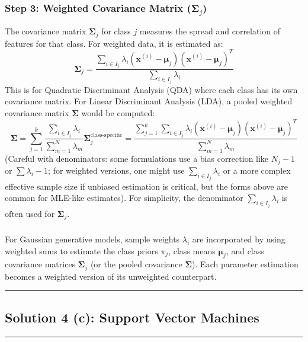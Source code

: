 \documentclass{article}
\begin{document}
\subsubsection*{Step 3: Weighted Covariance Matrix ($\boldsymbol{\Sigma}_j$)}
\parbox{\textwidth}{
The covariance matrix $\boldsymbol{\Sigma}_j$ for class $j$ measures the spread and correlation of features for that class. For weighted data, it is estimated as:
$$ \boldsymbol{\Sigma}_j = \frac{\sum_{i \in I_j} \lambda_i (\mathbf{x}^{(i)} - \boldsymbol{\mu}_j)(\mathbf{x}^{(i)} - \boldsymbol{\mu}_j)^T}{\sum_{i \in I_j} \lambda_i} $$
This is for Quadratic Discriminant Analysis (QDA) where each class has its own covariance matrix. For Linear Discriminant Analysis (LDA), a pooled weighted covariance matrix $\boldsymbol{\Sigma}$ would be computed:
$$ \boldsymbol{\Sigma} = \sum_{j=1}^{k} \frac{\sum_{i \in I_j} \lambda_i}{\sum_{m=1}^{N} \lambda_m} \boldsymbol{\Sigma}_j^{\text{class-specific}} = \frac{\sum_{j=1}^{k} \sum_{i \in I_j} \lambda_i (\mathbf{x}^{(i)} - \boldsymbol{\mu}_j)(\mathbf{x}^{(i)} - \boldsymbol{\mu}_j)^T}{\sum_{m=1}^{N} \lambda_m} $$
(Careful with denominators: some formulations use a bias correction like $N_j-1$ or $\sum \lambda_i - 1$; for weighted versions, one might use $\sum_{i \in I_j} \lambda_i$ or a more complex effective sample size if unbiased estimation is critical, but the forms above are common for MLE-like estimates). For simplicity, the denominator $\sum_{i \in I_j} \lambda_i$ is often used for $\boldsymbol{\Sigma}_j$.
}

\subsubsection*{}
\parbox{\textwidth}{
For Gaussian generative models, sample weights $\lambda_i$ are incorporated by using weighted sums to estimate the class priors $\pi_j$, class means $\boldsymbol{\mu}_j$, and class covariance matrices $\boldsymbol{\Sigma}_j$ (or the pooled covariance $\boldsymbol{\Sigma}$). Each parameter estimation becomes a weighted version of its unweighted counterpart.
}

\noindent\rule{\textwidth}{0.4pt}

\newpage

\subsection*{Solution 4 (c): Support Vector Machines}
\noindent\rule{\textwidth}{0.4pt}
\end{document}
